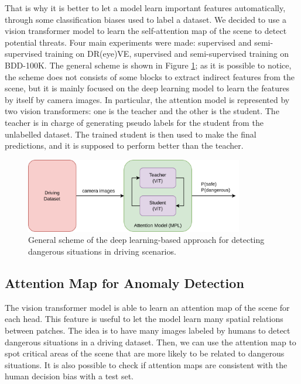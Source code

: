That is why it is better to let a model learn important features automatically, through 
some classification biases used to label a dataset. We decided to use a vision 
transformer model to learn the self-attention map of the scene to detect 
potential threats.
Four main experiments were made: supervised and semi-supervised training on DR(eye)VE, 
supervised and semi-supervised training on BDD-100K.
The general scheme is shown in Figure \ref{fig:dl_approach_scheme}; as it is 
possible to notice, the scheme does not consists of some blocks to extract 
indirect features from the scene, but it is mainly focused on the deep learning 
model to learn the features by itself by camera images. In particular, the 
attention model is represented by two vision transformers: one is the teacher and 
the other is the student. The teacher is in charge of generating pseudo labels 
for the student from the unlabelled dataset. The trained student is then used 
to make the final predictions, and it is supposed to perform better than the
teacher.
\begin{figure}
\centering
\includegraphics[width=0.85\textwidth]{images/ssl/dl_approach_scheme.png}
\vspace{0.4cm}
\caption[Deep learning-based detection model of dangerous scenarios.]
{General scheme of the deep learning-based approach for detecting
dangerous situations in driving scenarios.}
\label{fig:dl_approach_scheme}
\end{figure}

\subsection{Attention Map for Anomaly Detection}
The vision transformer model is able to learn an attention map of the scene for 
each head. This feature is useful to let the model learn many spatial relations 
between patches. The idea is to have many images labeled by humans to detect 
dangerous situations in a driving dataset. Then, we can use the attention map 
to spot critical areas of the scene that are more likely to be related to 
dangerous situations.
It is also possible to check if attention maps are consistent with the human 
decision bias with a test set.


